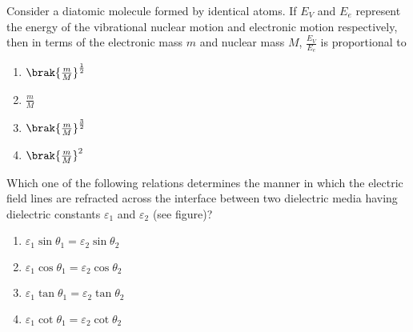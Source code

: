 \item Consider a diatomic molecule formed by identical atoms. If $E_V$ and $E_e$ represent the energy of the vibrational nuclear motion and electronic motion respectively, then in terms of the electronic mass $m$ and nuclear mass $M$, $\frac{E_V}{E_e}$ is proportional to

\begin{enumerate}
\item $\brak{\frac{m}{M}}^{\frac{1}{2}}$
\item $\frac{m}{M}$
\item $\brak{\frac{m}{M}}^{\frac{3}{2}}$
\item $\brak{\frac{m}{M}}^2$
\end{enumerate}

\item Which one of the following relations determines the manner in which the electric field lines are refracted across the interface between two dielectric media having dielectric constants $\varepsilon_1$ and $\varepsilon_2$ (see figure)?


\begin{enumerate}
\item $\varepsilon_1\sin{\theta_1}=\varepsilon_2\sin{\theta_2}$
\item $\varepsilon_1\cos{\theta_1}=\varepsilon_2\cos{\theta_2}$
\item $\varepsilon_1\tan{\theta_1}=\varepsilon_2\tan{\theta_2}$
\item $\varepsilon_1\cot{\theta_1}=\varepsilon_2\cot{\theta_2}$
\end{enumerate}

